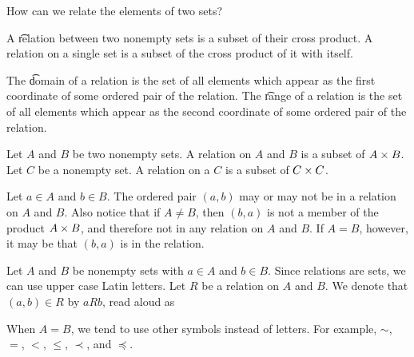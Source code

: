
\sbasic










\sstart
{}


How can we relate the elements of two sets?


A \t{relation} between two nonempty sets is a subset of their cross product.
A relation on a single set is a subset of the cross product of it with itself.

The \t{domain} of a relation is the set of all elements which appear as the first coordinate of some ordered pair of the relation.
The \t{range} of a relation is the set of all elements which appear as the second coordinate of some ordered pair of the relation.


Let $A$ and $B$ be two nonempty sets.
A relation on $A$ and $B$ is a subset of $A \times B$.
Let $C$ be a nonempty set.
A relation on a $C$ is a subset of $C \times C$.

Let $a \in A$ and $b \in B$.
The ordered pair $(a, b)$ may or may not be in a relation on $A$ and $B$.
Also notice that if $A \neq B$, then $(b, a)$ is not a member of the product $A \times B$, and therefore not in any relation on $A$ and $B$.
If $A = B$, however, it may be that $(b, a)$ is in the relation.


Let $A$ and $B$ be nonempty sets
with $a \in A$ and $b \in B$.
Since relations are sets,
we can use upper case Latin letters.
Let $R$ be a relation on $A$ and $B$.
We denote that $(a, b) \in R$ by
$a R b$, read aloud as

When $A = B$, we tend to use other symbols instead of letters.
For example,
$\sim$, $=$, $<$,
$\leq$, $\prec$, and $\preceq$.
\strats
